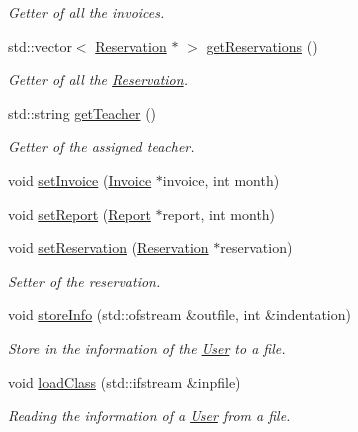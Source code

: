 \begin{DoxyCompactItemize}
\begin{DoxyCompactList}\small\item\em Getter of all the invoices. \end{DoxyCompactList}\item 
std\+::vector$<$ \mbox{\hyperlink{class_reservation}{Reservation}} $\ast$ $>$ \mbox{\hyperlink{class_user_a7443c5c7b1cca31c8400130568050327}{get\+Reservations}} ()
\begin{DoxyCompactList}\small\item\em Getter of all the \mbox{\hyperlink{class_reservation}{Reservation}}. \end{DoxyCompactList}\item 
std\+::string \mbox{\hyperlink{class_user_ac9fcbd4f944689de5faf746aa277d81a}{get\+Teacher}} ()
\begin{DoxyCompactList}\small\item\em Getter of the assigned teacher. \end{DoxyCompactList}\item 
void \mbox{\hyperlink{class_user_ad0432b83c7379ca57ed782d2929f3b8a}{set\+Invoice}} (\mbox{\hyperlink{class_invoice}{Invoice}} $\ast$invoice, int month)
\item 
void \mbox{\hyperlink{class_user_a0cdc359989bc67c3a135737cf1232a49}{set\+Report}} (\mbox{\hyperlink{class_report}{Report}} $\ast$report, int month)
\item 
void \mbox{\hyperlink{class_user_ab0e9dba3828977748ad6316eb346a854}{set\+Reservation}} (\mbox{\hyperlink{class_reservation}{Reservation}} $\ast$reservation)
\begin{DoxyCompactList}\small\item\em Setter of the reservation. \end{DoxyCompactList}\item 
void \mbox{\hyperlink{class_user_aac5ff0f6899f3ce56d1b2d12ed557c79}{store\+Info}} (std\+::ofstream \&outfile, int \&indentation)
\begin{DoxyCompactList}\small\item\em Store in the information of the \mbox{\hyperlink{class_user}{User}} to a file. \end{DoxyCompactList}\item 
void \mbox{\hyperlink{class_user_abc12a9ca668bd860a3d6d2ae4791997d}{load\+Class}} (std\+::ifstream \&inpfile)
\begin{DoxyCompactList}\small\item\em Reading the information of a \mbox{\hyperlink{class_user}{User}} from a file. \end{DoxyCompactList}\item 

\end{DoxyCompactItemize}
